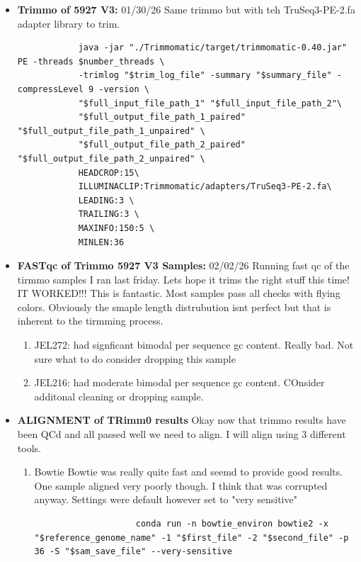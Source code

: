 \documentclass{article}
\begin{document}
\begin{itemize}
        \item \textbf{Trimmo of 5927 V3:}  01/30/26  Same trimmo but with teh TruSeq3-PE-2.fa adapter library to trim.
        \begin{verbatim}
            java -jar "./Trimmomatic/target/trimmomatic-0.40.jar" PE -threads $number_threads \
            -trimlog "$trim_log_file" -summary "$summary_file" -compressLevel 9 -version \
            "$full_input_file_path_1" "$full_input_file_path_2"\
            "$full_output_file_path_1_paired" "$full_output_file_path_1_unpaired" \
            "$full_output_file_path_2_paired" "$full_output_file_path_2_unpaired" \
            HEADCROP:15\
            ILLUMINACLIP:Trimmomatic/adapters/TruSeq3-PE-2.fa\
            LEADING:3 \
            TRAILING:3 \
            MAXINFO:150:5 \
            MINLEN:36
        \end{verbatim}

        \item \textbf{FASTqc of Trimmo 5927 V3 Samples:} 02/02/26   Running fast qc of the tirmmo samples I ran last friday.   Lets hope it trims the right stuff this time!   IT WORKED!!!   This is fantastic.  Most samples pass all checks with flying colors.   Obviously the smaple length distrubution isnt perfect but that is inherent to the tirmming process.
        \begin{enumerate}
            \item JEL272:  had signficant bimodal per sequence gc content.   Really bad.  Not sure what to do consider dropping this sample
            \item JEL216: had moderate bimodal per sequence gc content.   COnsider additonal cleaning or dropping sample.
        \end{enumerate}


        \item \textbf{ALIGNMENT of TRimm0 results}
        Okay now that trimmo results have been QCd and all passed well we need to align.   I will align using 3 different tools.
        \begin{enumerate}
            \item Bowtie
                Bowtie was really quite fast and seemd to provide good results.  One sample aligned very poorly though.   I think that was corrupted anyway.
                Settings were default however set to "very sensitive"
                \begin{verbatim}
                    conda run -n bowtie_environ bowtie2 -x "$reference_genome_name" -1 "$first_file" -2 "$second_file" -p 36 -S "$sam_save_file" --very-sensitive
                \end{verbatim}


\end{enumerate}
\end{itemize}
\end{document}
